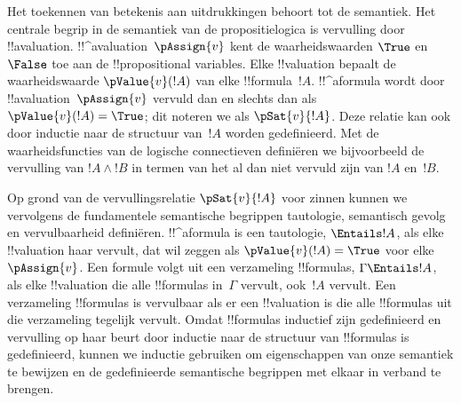 \documentclass[../../../include/open-logic-section]{subfiles}
\begin{document}
Het toekennen van betekenis aan uitdrukkingen behoort tot de semantiek.
Het centrale begrip in de semantiek van de propositielogica is
vervulling door !!a{valuation}. !!^a{valuation}~$\pAssign{v}$ kent de
waarheidswaarden $\True$ en $\False$ toe aan de !!{propositional
variable}s. Elke !!{valuation} bepaalt de waarheidswaarde
$\pValue{v}(!A)$ van elke !!{formula}~$!A$. !!^a{formula} wordt door
!!a{valuation}~$\pAssign{v}$ vervuld dan en slechts dan als
$\pValue{v}(!A) = \True$; dit noteren we als $\pSat{v}{!A}$. Deze
relatie kan ook door inductie naar de structuur van~$!A$ worden
gedefinieerd. Met de waarheidsfuncties van de logische connectieven
definiëren we bijvoorbeeld de vervulling van $!A \land !B$ in termen
van het al dan niet vervuld zijn van $!A$ en~$!B$.

Op grond van de vervullingsrelatie $\pSat{v}{!A}$ voor zinnen kunnen we
vervolgens de fundamentele semantische begrippen tautologie, semantisch
gevolg en vervulbaarheid definiëren. !!^a{formula} is een tautologie,
$\Entails !A$, als elke !!{valuation} haar vervult, dat wil zeggen als
$\pValue{v}(!A) = \True$ voor elke~$\pAssign{v}$. Een formule volgt uit
een verzameling !!{formula}s, $\Gamma \Entails !A$, als elke
!!{valuation} die alle !!{formula}s in~$\Gamma$ vervult, ook~$!A$
vervult. Een verzameling !!{formula}s is vervulbaar als er een
!!{valuation} is die alle !!{formula}s uit die verzameling tegelijk
vervult. Omdat !!{formula}s inductief zijn gedefinieerd en vervulling
op haar beurt door inductie naar de structuur van !!{formula}s is
gedefinieerd, kunnen we inductie gebruiken om eigenschappen van onze
semantiek te bewijzen en de gedefinieerde semantische begrippen met
elkaar in verband te brengen.
\end{document}

